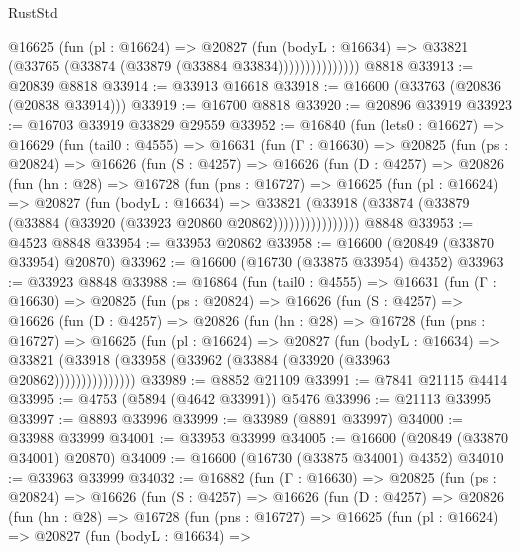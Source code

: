 \begin{lexlean}{RustStd}
\begin{coremodule}
{\begin{coremodule}
{{{{{{{{{{{{{{{{{{{{{{{{{{{{{{{{{{{{{{{{{{{{{{{{{{{{{{{                    @16625
                      (fun (pl : @16624) =>
                      @20827
                        (fun (bodyL : @16634) =>
                        @33821 (@33765 (@33874 (@33879 (@33884 @33834)))))))))))))))
    @8818
@33913 := @20839 @8818
@33914 := @33913 @16618
@33918 := @16600 (@33763 (@20836 (@20838 @33914)))
@33919 := @16700 @8818
@33920 := @20896 @33919
@33923 := @16703 @33919 @33829 @29559
@33952 := @16840
    (fun (lets0 : @16627) =>
    @16629
      (fun (tail0 : @4555) =>
      @16631
        (fun (Γ : @16630) =>
        @20825
          (fun (ps : @20824) =>
          @16626
            (fun (S : @4257) =>
            @16626
              (fun (D : @4257) =>
              @20826
                (fun (hn : @28) =>
                @16728
                  (fun (pns : @16727) =>
                  @16625
                    (fun (pl : @16624) =>
                    @20827
                      (fun (bodyL : @16634) =>
                      @33821
                        (@33918
                          (@33874 (@33879 (@33884 (@33920 (@33923 @20860 @20862))))))))))))))))
    @8848
@33953 := @4523 @8848
@33954 := @33953 @20862
@33958 := @16600 (@20849 (@33870 @33954) @20870)
@33962 := @16600 (@16730 (@33875 @33954) @4352)
@33963 := @33923 @8848
@33988 := @16864
    (fun (tail0 : @4555) =>
    @16631
      (fun (Γ : @16630) =>
      @20825
        (fun (ps : @20824) =>
        @16626
          (fun (S : @4257) =>
          @16626
            (fun (D : @4257) =>
            @20826
              (fun (hn : @28) =>
              @16728
                (fun (pns : @16727) =>
                @16625
                  (fun (pl : @16624) =>
                  @20827
                    (fun (bodyL : @16634) =>
                    @33821 (@33918 (@33958 (@33962 (@33884 (@33920 (@33963 @20862)))))))))))))))
@33989 := @8852 @21109
@33991 := @7841 @21115 @4414
@33995 := @4753 (@5894 (@4642 @33991)) @5476
@33996 := @21113 @33995
@33997 := @8893 @33996
@33999 := @33989 (@8891 @33997)
@34000 := @33988 @33999
@34001 := @33953 @33999
@34005 := @16600 (@20849 (@33870 @34001) @20870)
@34009 := @16600 (@16730 (@33875 @34001) @4352)
@34010 := @33963 @33999
@34032 := @16882
    (fun (Γ : @16630) =>
    @20825
      (fun (ps : @20824) =>
      @16626
        (fun (S : @4257) =>
        @16626
          (fun (D : @4257) =>
          @20826
            (fun (hn : @28) =>
            @16728
              (fun (pns : @16727) =>
              @16625
                (fun (pl : @16624) =>
                @20827
                  (fun (bodyL : @16634) =>
}}}}}}}}}}}}}}}}}}}}}}}}}}}}}}}}}}}}}}}}}}}}}}}}}}}}}}}
\end{coremodule}}
\end{coremodule}
\end{lexlean}
